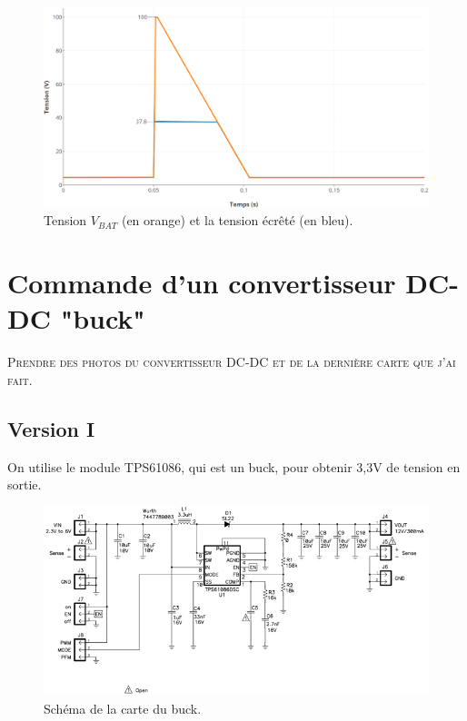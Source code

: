\begin{figure}[H]
    \centering
    \includegraphics[width=1.00\textwidth]{images/reponse-ecreteur-avec-transistor}
    \caption{Tension $V_{BAT}$ (en orange) et la tension écrêté (en bleu).}
    \label{fig:reponse-ecreteur-avec-transistor}
\end{figure}







\section{Commande d'un convertisseur DC-DC "buck"}

\textsc{Prendre des photos du convertisseur DC-DC et de la dernière carte que j'ai fait.}

\subsection{Version I}

On utilise le module TPS61086, qui est un buck, pour obtenir 3,3V de tension en sortie.

\begin{figure}[H]
    \centering
    \includegraphics[width=1.00\textwidth]{images/schematic_TPS61086}
    \caption{Schéma de la carte du buck.}
    \label{fig:schematic_TPS61086}
\end{figure}


